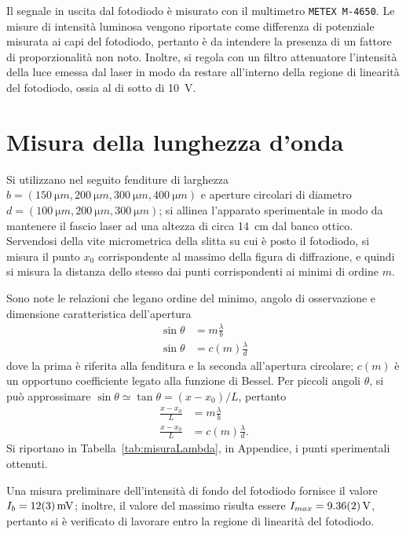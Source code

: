\documentclass[10pt,oneside,a4paper]{article}
\begin{document}
\begin{multicols}{2}
Il segnale in uscita dal fotodiodo è misurato con il multimetro \texttt{METEX M-4650}. Le misure di intensità luminosa vengono riportate come differenza di potenziale misurata ai capi del fotodiodo, pertanto è da intendere la presenza di un fattore di proporzionalità non noto. Inoltre, si regola con un filtro attenuatore l'intensità della luce emessa dal laser in modo da restare all'interno della regione di linearità del fotodiodo, ossia al di sotto di \SI{10}{V}.

\section{Misura della lunghezza d'onda}
Si utilizzano nel seguito fenditure di larghezza $b = (\SI{150}{\micro m}, \SI{200}{\micro m}, \SI{300}{\micro m}, \SI{400}{\micro m})$ e aperture circolari di diametro $d = (\SI{100}{\micro m}, \SI{200}{\micro m}, \SI{300}{\micro m})$; si allinea l'apparato sperimentale in modo da mantenere il fascio laser ad una altezza di circa \SI{14}{cm} dal banco ottico. Servendosi della vite micrometrica della slitta su cui è posto il fotodiodo, si misura il punto $x_0$ corrispondente al massimo della figura di diffrazione, e quindi si misura la distanza dello stesso dai punti corrispondenti ai minimi di ordine $m$.

Sono note le relazioni che legano ordine del minimo, angolo di osservazione e dimensione caratteristica dell'apertura
\[
\begin{aligned}
\sin\theta &= m\frac{\lambda}{b} \\
\sin\theta &= c(m)\frac{\lambda}{d}
\end{aligned}
\]
dove la prima è riferita alla fenditura e la seconda all'apertura circolare; $c(m)$ è un opportuno coefficiente legato alla funzione di Bessel. Per piccoli angoli $\theta$, si può approssimare $\sin\theta \simeq \tan\theta = (x-x_0) / L$, pertanto
\[
\begin{aligned}
\frac{x-x_0}{L} &= m\frac{\lambda}{b} \\
\frac{x-x_0}{L} &= c(m)\frac{\lambda}{d}.
\end{aligned}
\]
Si riportano in Tabella~\ref{tab:misuraLambda}, in Appendice, i punti sperimentali ottenuti.

Una misura preliminare dell'intensità di fondo del fotodiodo fornisce il valore $I_b = \SI{12 \pm 3}{mV}$; inoltre, il valore del massimo risulta essere $I_{max} = \SI{9.36 \pm 0.02}{V}$, pertanto si è verificato di lavorare entro la regione di linearità del fotodiodo.


\end{multicols}
\end{document}
